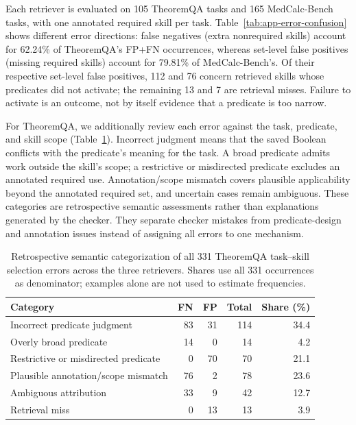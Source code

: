 Each retriever is evaluated on 105 TheoremQA tasks and 165 MedCalc-Bench tasks, with one annotated required skill per task. Table~\ref{tab:app-error-confusion} shows different error directions: false negatives (extra nonrequired skills) account for 62.24\% of TheoremQA's FP+FN occurrences, whereas set-level false positives (missing required skills) account for 79.81\% of MedCalc-Bench's. Of their respective set-level false positives, 112 and 76 concern retrieved skills whose predicates did not activate; the remaining 13 and 7 are retrieval misses. Failure to activate is an outcome, not by itself evidence that a predicate is too narrow.

For TheoremQA, we additionally review each error against the task, predicate, and skill scope (Table~\ref{tab:app-error-attribution}). Incorrect judgment means that the saved Boolean conflicts with the predicate's meaning for the task. A broad predicate admits work outside the skill's scope; a restrictive or misdirected predicate excludes an annotated required use. Annotation/scope mismatch covers plausible applicability beyond the annotated required set, and uncertain cases remain ambiguous. These categories are retrospective semantic assessments rather than explanations generated by the checker. They separate checker mistakes from predicate-design and annotation issues instead of assigning all errors to one mechanism.

\begin{table}[t]
\centering
\small
\begin{tabular}{lrrrr}
\toprule
Category & FN & FP & Total & Share (\%) \\
\midrule
Incorrect predicate judgment & 83 & 31 & 114 & 34.4 \\
Overly broad predicate & 14 & 0 & 14 & 4.2 \\
Restrictive or misdirected predicate & 0 & 70 & 70 & 21.1 \\
Plausible annotation/scope mismatch & 76 & 2 & 78 & 23.6 \\
Ambiguous attribution & 33 & 9 & 42 & 12.7 \\
Retrieval miss & 0 & 13 & 13 & 3.9 \\
\bottomrule
\end{tabular}
\caption{Retrospective semantic categorization of all 331 TheoremQA task--skill selection errors across the three retrievers. Shares use all 331 occurrences as denominator; examples alone are not used to estimate frequencies.}
\label{tab:app-error-attribution}
\end{table}
